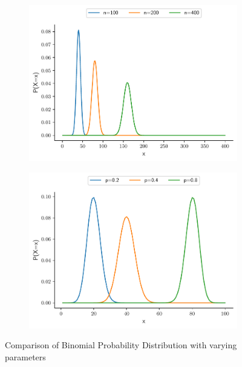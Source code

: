 \documentclass[twoside,12pt]{report}  %
\begin{document}
\begin{figure}[H]
	\centering
	\begin{subfigure}[b]{0.3\textwidth}
		\includegraphics[width=\textwidth]{./images/binomial_example_n.pdf}
	\end{subfigure}
	\begin{subfigure}[b]{0.3\textwidth}
		\includegraphics[width=\textwidth]{./images/binomial_example_p.pdf}
	\end{subfigure}
	\caption{Comparison of Binomial Probability Distribution with varying parameters}
	\label{figure_binomial_comparison}
\end{figure}
\end{document}
